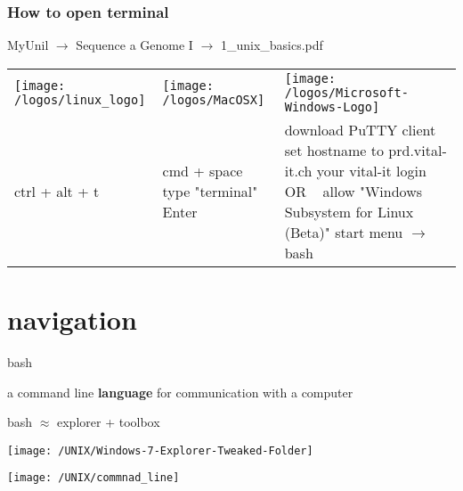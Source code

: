 \documentclass[xcolor=dvipsnames]{beamer}
\begin{document}
\begin{frame}
	\frametitle{How to open terminal}

	\begin{center}
		MyUnil $\rightarrow$ Sequence a Genome I $\rightarrow$ 1\_unix\_basics.pdf
	\end{center}

	\small
	\begin{tabular}{C{0.3\textwidth} | C{0.3\textwidth} | C{0.3\textwidth}}
	 	 \texttt{[image: /logos/linux\_logo]} &
		 \texttt{[image: /logos/MacOSX]} &
		 \texttt{[image: /logos/Microsoft-Windows-Logo]} \\
		 ctrl + alt + t &
		 cmd + space \newline type "terminal" \newline Enter &
		 download PuTTY client \newline set hostname to prd.vital-it.ch \newline your vital-it login \newline
		 ~ \newline OR \newline ~ \newline
		 allow "Windows Subsystem for Linux (Beta)" \newline start menu $\rightarrow$ bash\\
	\end{tabular}

\end{frame}

\section{navigation}

\begin{frame}
	\Huge
	\begin{center}
		bash
	\end{center}
	\large
	a command line \textbf{language} for communication with a computer
\end{frame}

\begin{frame}
	bash $\approx$ explorer + toolbox
	\begin{center}
		\texttt{[image: /UNIX/Windows-7-Explorer-Tweaked-Folder]}
	\end{center}
\end{frame}

\begin{frame}
	\begin{center}
		\texttt{[image: /UNIX/commnad\_line]}
	\end{center}
\end{frame}
\end{document}
